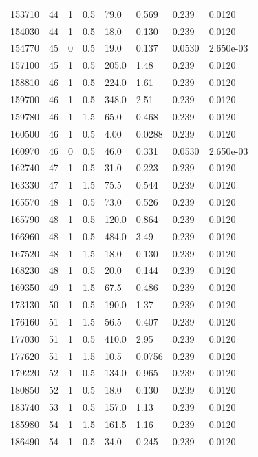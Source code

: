 \documentclass[preview]{standalone}
\begin{document}
{{{{\begin{tabular}{L{1.2cm}C{1.2cm} C{0.3cm}C{0.5cm} C{1.4cm}C{1.4cm} C{1.4cm}C{1.4cm}}
  153710  &    44  & 1     & 0.5 &  79.0  & 0.569  & 0.239 &  0.0120   \\ 
  154030  &    44  & 1     & 0.5 &  18.0  & 0.130  & 0.239 &  0.0120   \\ 
  154770  &    45  & 0     & 0.5 &  19.0  & 0.137  & 0.0530 &  2.650e-03   \\ 
  157100  &    45  & 1     & 0.5 &  205.0  & 1.48  & 0.239 &  0.0120   \\ 
  158810  &    46  & 1     & 0.5 &  224.0  & 1.61  & 0.239 &  0.0120   \\ 
  159700  &    46  & 1     & 0.5 &  348.0  & 2.51  & 0.239 &  0.0120   \\ 
  159780  &    46  & 1     & 1.5 &  65.0  & 0.468  & 0.239 &  0.0120   \\ 
  160500  &    46  & 1     & 0.5 &  4.00  & 0.0288  & 0.239 &  0.0120   \\ 
  160970  &    46  & 0     & 0.5 &  46.0  & 0.331  & 0.0530 &  2.650e-03   \\ 
  162740  &    47  & 1     & 0.5 &  31.0  & 0.223  & 0.239 &  0.0120   \\ 
  163330  &    47  & 1     & 1.5 &  75.5  & 0.544  & 0.239 &  0.0120   \\ 
  165570  &    48  & 1     & 0.5 &  73.0  & 0.526  & 0.239 &  0.0120   \\ 
  165790  &    48  & 1     & 0.5 &  120.0  & 0.864  & 0.239 &  0.0120   \\ 
  166960  &    48  & 1     & 0.5 &  484.0  & 3.49  & 0.239 &  0.0120   \\ 
  167520  &    48  & 1     & 1.5 &  18.0  & 0.130  & 0.239 &  0.0120   \\ 
  168230  &    48  & 1     & 0.5 &  20.0  & 0.144  & 0.239 &  0.0120   \\ 
  169350  &    49  & 1     & 1.5 &  67.5  & 0.486  & 0.239 &  0.0120   \\ 
  173130  &    50  & 1     & 0.5 &  190.0  & 1.37  & 0.239 &  0.0120   \\ 
  176160  &    51  & 1     & 1.5 &  56.5  & 0.407  & 0.239 &  0.0120   \\ 
  177030  &    51  & 1     & 0.5 &  410.0  & 2.95  & 0.239 &  0.0120   \\ 
  177620  &    51  & 1     & 1.5 &  10.5  & 0.0756  & 0.239 &  0.0120   \\ 
  179220  &    52  & 1     & 0.5 &  134.0  & 0.965  & 0.239 &  0.0120   \\ 
  180850  &    52  & 1     & 0.5 &  18.0  & 0.130  & 0.239 &  0.0120   \\ 
  183740  &    53  & 1     & 0.5 &  157.0  & 1.13  & 0.239 &  0.0120   \\ 
  185980  &    54  & 1     & 1.5 &  161.5  & 1.16  & 0.239 &  0.0120   \\ 
  186490  &    54  & 1     & 0.5 &  34.0  & 0.245  & 0.239 &  0.0120   \\ 
\hline 
\end{tabular} 

}}}}
\end{document}
